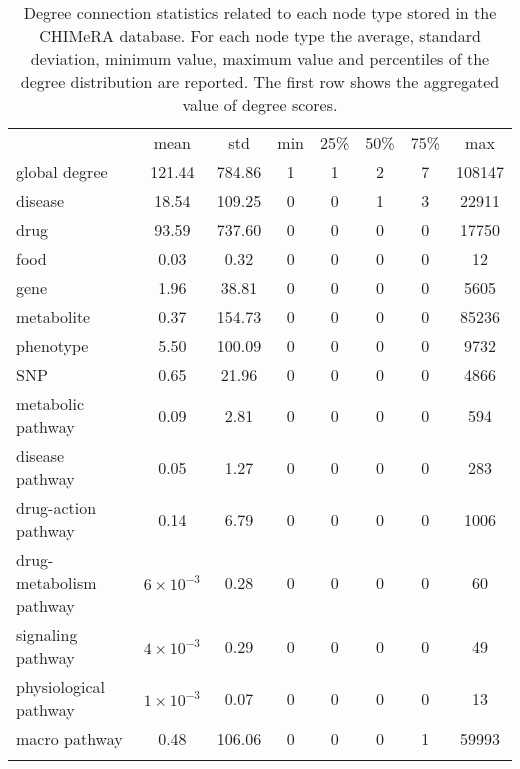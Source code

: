 \documentclass{standalone}
\begin{document}
\begin{table}
\centering
\begin{tabular}{lccccccc}
\hline\rowcolor{darkgrayrow}
                        & mean            &  std    &  min & 25\% & 50\% & 75\% &   max  \\
global degree           & 121.44          &  784.86 &    1 &    1 &    2 &    7 & 108147 \\
disease                 &  18.54          &  109.25 &    0 &    0 &    1 &    3 &  22911 \\
drug                    &  93.59          &  737.60 &    0 &    0 &    0 &    0 &  17750 \\
food                    &   0.03          &    0.32 &    0 &    0 &    0 &    0 &     12 \\
gene                    &   1.96          &   38.81 &    0 &    0 &    0 &    0 &   5605 \\
metabolite              &   0.37          &  154.73 &    0 &    0 &    0 &    0 &  85236 \\
phenotype               &   5.50          &  100.09 &    0 &    0 &    0 &    0 &   9732 \\
SNP                     &   0.65          &   21.96 &    0 &    0 &    0 &    0 &   4866 \\
metabolic pathway       &   0.09          &    2.81 &    0 &    0 &    0 &    0 &    594 \\
disease pathway         &   0.05          &    1.27 &    0 &    0 &    0 &    0 &    283 \\
drug-action pathway     &   0.14          &    6.79 &    0 &    0 &    0 &    0 &   1006 \\
drug-metabolism pathway &$6\times10^{-3}$ &    0.28 &    0 &    0 &    0 &    0 &     60 \\
signaling pathway       &$4\times10^{-3}$ &    0.29 &    0 &    0 &    0 &    0 &     49 \\
physiological pathway   &$1\times10^{-3}$ &    0.07 &    0 &    0 &    0 &    0 &     13 \\
macro pathway           &   0.48          &  106.06 &    0 &    0 &    0 &    1 &  59993 \\
\hline\\
\end{tabular}
\caption{Degree connection statistics related to each node type stored in the \textsf{CHIMeRA} database.
For each node type the average, standard deviation, minimum value, maximum value and percentiles of the degree distribution are reported.
The first row shows the aggregated value of degree scores.
}
\label{tab:chimera_degree}
\end{table}
\end{document}
